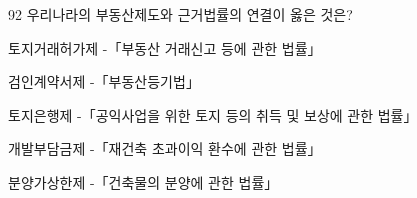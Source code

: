 \begin{question}{92}
우리나라의 부동산제도와 근거법률의 연결이 옳은 것은?
\begin{choices}
  \item 토지거래허가제 -「부동산 거래신고 등에 관한 법률」
  \item 검인계약서제 -「부동산등기법」
  \item 토지은행제 -「공익사업을 위한 토지 등의 취득 및 보상에 관한 법률」
  \item 개발부담금제 -「재건축 초과이익 환수에 관한 법률」
  \item 분양가상한제 -「건축물의 분양에 관한 법률」
\end{choices}
\end{question}
